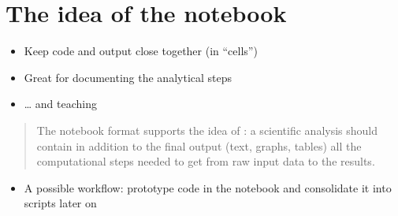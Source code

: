 \documentclass[letterpaper,10pt,english]{jupyterBook}
\begin{document}
\section{The idea of the notebook}
\label{\detokenize{content/Python/Intro_Jupyter_notebook:the-idea-of-the-notebook}}\begin{itemize}
\item {} 
\sphinxAtStartPar
Keep code and output close together (in “cells”)

\item {} 
\sphinxAtStartPar
Great for documenting the analytical steps

\item {} 
\sphinxAtStartPar
… and teaching

\end{itemize}
\begin{quote}

\sphinxAtStartPar
The notebook format supports the idea of : a scientific analysis should contain \sphinxhyphen{} in addition to the final output (text, graphs, tables) \sphinxhyphen{} all the computational steps needed to get from raw input data to the results.
\end{quote}
\begin{itemize}
\item {} 
\sphinxAtStartPar
A possible workflow:
prototype code in the notebook and consolidate it into scripts later on

\end{itemize}
\end{document}
